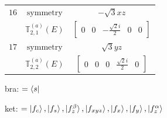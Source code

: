 \documentclass[fleqn,8pt,landscape]{jsarticle}
\begin{document}
\begin{longtable}{ccc}
$ 16 $ & $ \text{symmetry} $ & $ - \sqrt{3} x z $ \\
$  $ & $ \mathbb{T}_{2,1}^{(a)}(E) $ & $ \begin{bmatrix} 0 & 0 & - \frac{\sqrt{2} i}{2} & 0 & 0 \end{bmatrix} $ \\ \hline
$ 17 $ & $ \text{symmetry} $ & $ \sqrt{3} y z $ \\
$  $ & $ \mathbb{T}_{2,2}^{(a)}(E) $ & $ \begin{bmatrix} 0 & 0 & 0 & \frac{\sqrt{2} i}{2} & 0 \end{bmatrix} $ \\ \hline
\end{longtable}
bra: $=\bra{s}$

\noindent
ket: $=\ket{f_{c}}, \ket{f_{s}}, \ket{f_{z}^{\beta}}, \ket{f_{xyz}}, \ket{f_{x}}, \ket{f_{y}}, \ket{f_{z}^{\alpha}}$
\renewcommand{\arraystretch}{1.6}
\end{document}
